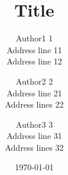 \documentclass{article}
\begin{document}
\title{Title}
\author{Author1 1\\
        Address line 11\\
        Address line 12
        \and
        Author2 2\\
        Address line 21\\
        Address lines 22\\
        \and
        Author3 3\\
        Address line 31\\
        Address lines 32}

\date{\today}

\maketitle
\end{document}
